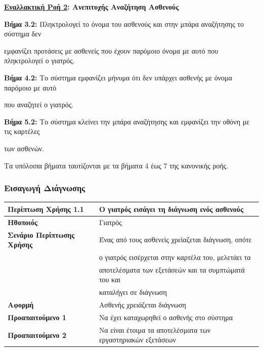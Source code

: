 \documentclass{article}
\newcommand\T{\rule{0pt}{2.6ex}}       %
\newcommand\B{\rule[-1.2ex]{0pt}{0pt}}
\begin{document}
\textbf{\underline{Εναλλακτική Ροή 2}: Ανεπιτυχής Αναζήτηση Ασθενούς}
\vspace{0.2cm}
\par \textbf{Βήμα 3.2:}  Πληκτρολογεί το όνομα του ασθενούς και στην μπάρα αναζήτησης το σύστημα δεν \par εμφανίζει προτάσεις με ασθενείς που έχουν παρόμοιο όνομα με αυτό που πληκτρολογεί ο γιατρός. \vspace{0.1cm}
\par \textbf{Βήμα 4.2:} Το σύστημα εμφανίζει μήνυμα ότι δεν υπάρχει ασθενής με όνομα παρόμοιο με αυτό \par που αναζητεί ο γιατρός. \vspace{0.1cm}
\par \textbf{Βήμα 5.2:} Το σύστημα κλείνει την μπάρα αναζήτησης και εμφανίζει την οθόνη με τις καρτέλες \par των ασθενών. \vspace{0.1cm}

\par Τα υπόλοιπα βήματα ταυτίζονται με τα βήματα 4 έως 7 της κανονικής ροής. 

\newpage

\subsubsection{Εισαγωγή Διάγνωσης}
 
 \begin{center}
     \begin{tabular}{|l|l|}
     \hline
      \textbf{Περίπτωση Χρήσης 1.1} & Ο γιατρός εισάγει τη διάγνωση ενός ασθενούς \T\B \\ 
      \hline
      \textbf{Ηθοποιός} & Γιατρός \T\B \\
      \hline
      \textbf{Σενάριο Περίπτωσης Χρήσης} & Ένας από τους ασθενείς χρείαζεται διάγνωση, οπότε \T\\& ο γιατρός εισέρχεται στην καρτέλα του, μελετάει τα\\& αποτελέσματα των εξετάσεών και τα συμπτώματά του και \\& καταλήγει σε διάγνωση \B \\
      \hline
      \textbf{Αφορμή} & Ασθενής χρειάζεται διάγνωση \T\B \\
      \hline
      \textbf{Προαπαιτούμενο 1} & Να έχει καταχωρηθεί ο ασθενής στο σύστημα \T\B \\
      \hline
      \textbf{Προαπαιτούμενο 2} & Να είναι έτοιμα τα αποτελέσματα των εργαστηριακών εξετάσεων \T\B \\
      \hline
     \end{tabular}
 \end{center}
 
\end{document}
